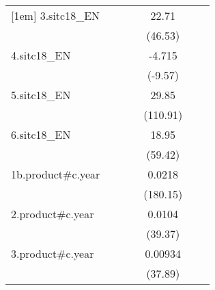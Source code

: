 {\begin{tabular}{l*{6}{c}}
[1em]
3.sitc18\_EN         &                     &                     &                     &       22.71\sym{***}&                     &                     \\
                    &                     &                     &                     &     (46.53)         &                     &                     \\
[1em]
4.sitc18\_EN         &                     &                     &                     &      -4.715\sym{***}&                     &                     \\
                    &                     &                     &                     &     (-9.57)         &                     &                     \\
[1em]
5.sitc18\_EN         &                     &                     &                     &       29.85\sym{***}&                     &                     \\
                    &                     &                     &                     &    (110.91)         &                     &                     \\
[1em]
6.sitc18\_EN         &                     &                     &                     &       18.95\sym{***}&                     &                     \\
                    &                     &                     &                     &     (59.42)         &                     &                     \\
[1em]
1b.product#c.year   &                     &                     &                     &      0.0218\sym{***}&                     &                     \\
                    &                     &                     &                     &    (180.15)         &                     &                     \\
[1em]
2.product#c.year    &                     &                     &                     &      0.0104\sym{***}&                     &                     \\
                    &                     &                     &                     &     (39.37)         &                     &                     \\
[1em]
3.product#c.year    &                     &                     &                     &     0.00934\sym{***}&                     &                     \\
                    &                     &                     &                     &     (37.89)         &                     &                     \\

\end{tabular}}
